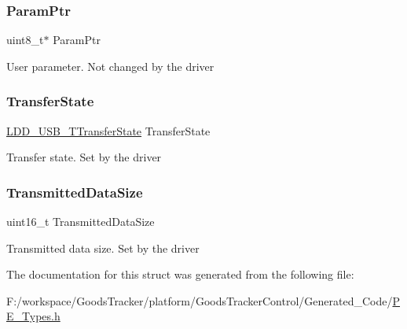 \subsubsection{\texorpdfstring{Param\+Ptr}{ParamPtr}}
{\footnotesize\ttfamily uint8\+\_\+t$\ast$ Param\+Ptr}

User parameter. Not changed by the driver \mbox{\label{struct_l_d_d___u_s_b___device___t_t_d___struct_a361e6414038c7475b4231dcbfe549250}} 
\subsubsection{\texorpdfstring{Transfer\+State}{TransferState}}
{\footnotesize\ttfamily \hyperlink{group___p_e___types__module_gacf5f7e704d87aba90dc002ed7c0d28b4}{L\+D\+D\+\_\+\+U\+S\+B\+\_\+\+T\+Transfer\+State} Transfer\+State}

Transfer state. Set by the driver \mbox{\label{struct_l_d_d___u_s_b___device___t_t_d___struct_a4efcf1223981c7a05b9cc518e95f94db}} 
\subsubsection{\texorpdfstring{Transmitted\+Data\+Size}{TransmittedDataSize}}
{\footnotesize\ttfamily uint16\+\_\+t Transmitted\+Data\+Size}

Transmitted data size. Set by the driver 

The documentation for this struct was generated from the following file\+:\begin{DoxyCompactItemize}
\item 
F\+:/workspace/\+Goods\+Tracker/platform/\+Goods\+Tracker\+Control/\+Generated\+\_\+\+Code/\hyperlink{_p_e___types_8h}{P\+E\+\_\+\+Types.\+h}\end{DoxyCompactItemize}
